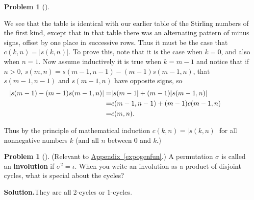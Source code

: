 \documentclass[10pt,]{book}
\newcommand{\terminology}[1]{\textbf{#1}}
\theoremstyle{plain}
\theoremstyle{definition}
\newtheorem{activity}[project]{Problem}
\theoremstyle{definition}
\numberwithin{equation}{chapter}
\newcommand{\amp}{&}
\begin{document}
\begin{activity}[]
{%
}%
\par
We see that the table is identical with our earlier table of the Stirling numbers of the first kind, except that in that table there was an alternating pattern of minus signs, offset by one place in successive rows. Thus it must be the case that \(c(k,n)=
|s(k,n)|\). To prove this, note that it is the case when \(k=0\), and also when \(n=1\). Now assume inductively it is true when \(k= m-1\) and notice that if \(n>0\), \(s(m,n)=s(m-1,n-1)-(m-1)s(m-1,n)\), that \(s(m-1,n-1)\) and \(s(m-1,n)\) have opposite signs, so%
\begin{align*}
\hspace{-.5in}|s(m-1)-(m-1)s(m-1,n)| =\amp  |s(m-1| +
(m-1)|s(m-1,n)|\\
=\amp c(m-1,n-1)+(m-1)c(m-1,n)\\
=\amp  c(m,n).
\end{align*}
%
\par
Thus by the principle of mathematical induction \(c(k,n) = |s(k,n)|\) for all nonnegative numbers \(k\) (and all \(n\) between 0 and \(k\).)%
\end{activity}
\begin{activity}[]\label{activity-278}
(Relevant to \hyperref[expogenfun]{Appendix~\ref{expogenfun}}.) A permutation \(\sigma\) is called an \terminology{involution} if \(\sigma^2=\iota\). When you write an involution as a product of disjoint cycles, what is special about the cycles?%
\par\medskip\noindent%
\textbf{Solution.}\quad They are all 2-cycles or 1-cycles.%
\end{activity}
\typeout{************************************************}
\typeout{************************************************}
\end{document}
